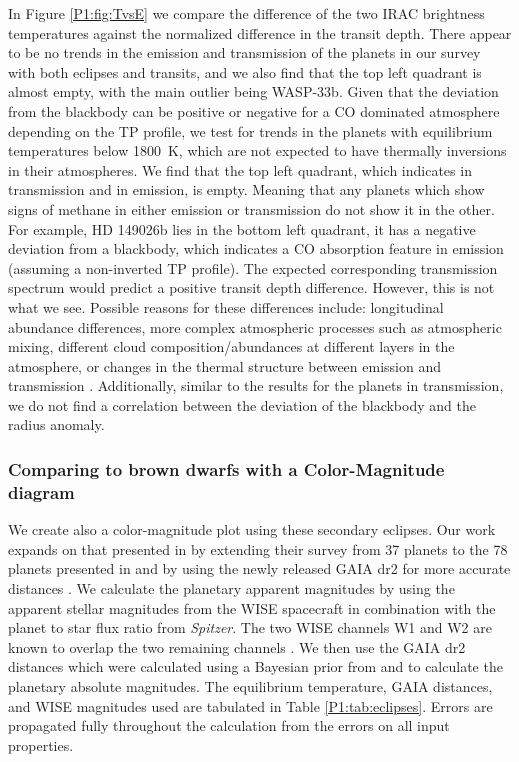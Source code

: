 In Figure \ref{P1:fig:TvsE} we compare the difference of the two IRAC brightness temperatures against the normalized difference in the transit depth. There appear to be no trends in the emission and transmission of the planets in our survey with both eclipses and transits, and we also find that the top left quadrant is almost empty, with the main outlier being WASP-33b. Given that the deviation from the blackbody can be positive or negative for a CO dominated atmosphere depending on the TP profile, we test for trends in the planets with equilibrium temperatures below 1800~K, which are not expected to have thermally inversions in their atmospheres. We find that the top left quadrant, which indicates  in transmission and  in emission, is empty. Meaning that any planets which show signs of methane in either emission or transmission do not show it in the other. For example, HD 149026b lies in the bottom left quadrant, it has a negative deviation from a blackbody, which indicates a CO absorption feature in emission (assuming a non-inverted TP profile). The expected corresponding transmission spectrum would predict a positive transit depth difference. However, this is not what we see. Possible reasons for these differences include: longitudinal abundance differences, more complex atmospheric processes such as atmospheric mixing, different cloud composition/abundances at different layers in the atmosphere, or changes in the thermal structure between emission and transmission \citep[e.g.,][]{Fortney2005}. Additionally, similar to the results for the planets in transmission, we do not find a correlation between the deviation of the blackbody and the radius anomaly.


\subsubsection{Comparing to brown dwarfs with a Color-Magnitude diagram}


We create also a color-magnitude plot using these \spitzer secondary eclipses. Our work expands on that presented in \citet{Triaud2014c} by extending their survey from 37 planets to the 78 planets presented in \citet{Baxter2020} and by using the newly released GAIA dr2 for more accurate distances \citep{GaiaCollaborationandBrown2018}. We calculate the planetary apparent magnitudes by using the apparent stellar magnitudes from the WISE spacecraft \citep{Cutri2012} in combination with the planet to star flux ratio from \textit{Spitzer}. The two WISE channels W1 and W2 are known to overlap the two remaining \spitzer channels \citep{Kirkpatrick2011}. We then use the GAIA dr2 distances which were calculated using a Bayesian prior from \citet{GaiaCollaborationandBrown2018} and \citet{Bailer-Jones2018} to calculate the planetary absolute magnitudes. The equilibrium temperature, GAIA distances, and WISE magnitudes used are tabulated in Table \ref{P1:tab:eclipses}. Errors are propagated fully throughout the calculation from the errors on all input properties.

